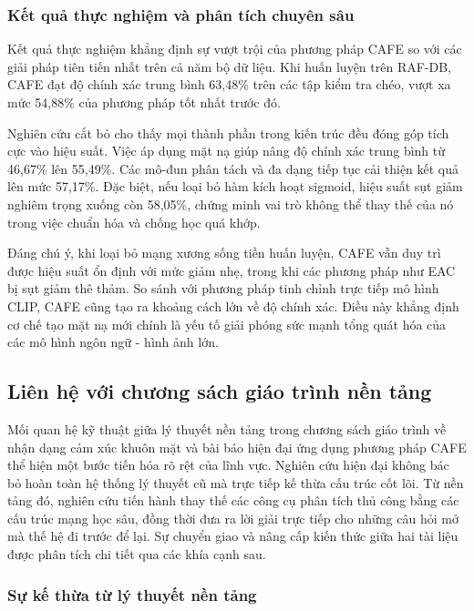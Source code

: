 \subsubsection{Kết quả thực nghiệm và phân tích chuyên sâu}

Kết quả thực nghiệm khẳng định sự vượt trội của phương pháp CAFE so với các giải pháp tiên tiến nhất trên cả năm bộ dữ liệu. Khi huấn luyện trên RAF-DB, CAFE đạt độ chính xác trung bình 63,48\% trên các tập kiểm tra chéo, vượt xa mức 54,88\% của phương pháp tốt nhất trước đó.

Nghiên cứu cắt bỏ cho thấy mọi thành phần trong kiến trúc đều đóng góp tích cực vào hiệu suất. Việc áp dụng mặt nạ giúp nâng độ chính xác trung bình từ 46,67\% lên 55,49\%. Các mô-đun phân tách và đa dạng tiếp tục cải thiện kết quả lên mức 57,17\%. Đặc biệt, nếu loại bỏ hàm kích hoạt sigmoid, hiệu suất sụt giảm nghiêm trọng xuống còn 58,05\%, chứng minh vai trò không thể thay thế của nó trong việc chuẩn hóa và chống học quá khớp.

Đáng chú ý, khi loại bỏ mạng xương sống tiền huấn luyện, CAFE vẫn duy trì được hiệu suất ổn định với mức giảm nhẹ, trong khi các phương pháp như EAC bị sụt giảm thê thảm. So sánh với phương pháp tinh chỉnh trực tiếp mô hình CLIP, CAFE cũng tạo ra khoảng cách lớn về độ chính xác. Điều này khẳng định cơ chế tạo mặt nạ mới chính là yếu tố giải phóng sức mạnh tổng quát hóa của các mô hình ngôn ngữ - hình ảnh lớn.

\subsection{Liên hệ với chương sách giáo trình nền tảng}

Mối quan hệ kỹ thuật giữa lý thuyết nền tảng trong chương sách giáo trình về nhận dạng cảm xúc khuôn mặt và bài báo hiện đại ứng dụng phương pháp CAFE thể hiện một bước tiến hóa rõ rệt của lĩnh vực. Nghiên cứu hiện đại không bác bỏ hoàn toàn hệ thống lý thuyết cũ mà trực tiếp kế thừa cấu trúc cốt lõi. Từ nền tảng đó, nghiên cứu tiến hành thay thế các công cụ phân tích thủ công bằng các cấu trúc mạng học sâu, đồng thời đưa ra lời giải trực tiếp cho những câu hỏi mở mà thế hệ đi trước để lại. Sự chuyển giao và nâng cấp kiến thức giữa hai tài liệu được phân tích chi tiết qua các khía cạnh sau.

\subsubsection{Sự kế thừa từ lý thuyết nền tảng}

